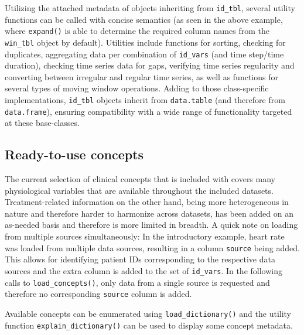 \documentclass[
  notitle,
  nojss,
  noheadings]{jss}
\begin{document}
Utilizing the attached metadata of objects inheriting from
\texttt{id\_tbl}, several utility functions can be called with concise
semantics (as seen in the above example, where \texttt{expand()} is able
to determine the required column names from the \texttt{win\_tbl} object
by default). Utilities include functions for sorting, checking for
duplicates, aggregating data per combination of \texttt{id\_vars} (and
time step/time duration), checking time series data for gaps, verifying
time series regularity and converting between irregular and regular time
series, as well as functions for several types of moving window
operations. Adding to those class-specific implementations,
\texttt{id\_tbl} objects inherit from \texttt{data.table} (and therefore
from \texttt{data.frame}), ensuring compatibility with a wide range of
functionality targeted at these base-classes.

\hypertarget{ready-to-use-concepts}{%
\subsection{Ready-to-use concepts}\label{ready-to-use-concepts}}

The current selection of clinical concepts that is included with
 covers many physiological variables that are available
throughout the included datasets. Treatment-related information on the
other hand, being more heterogeneous in nature and therefore harder to
harmonize across datasets, has been added on an as-needed basis and
therefore is more limited in breadth. A quick note on loading from
multiple sources simultaneously: In the introductory example, heart rate
was loaded from multiple data sources, resulting in a column
\texttt{source} being added. This allows for identifying patient IDs
corresponding to the respective data sources and the extra column is
added to the set of \texttt{id\_vars}. In the following calls to
\texttt{load\_concepts()}, only data from a single source is requested
and therefore no corresponding \texttt{source} column is added.

Available concepts can be enumerated using \texttt{load\_dictionary()}
and the utility function \texttt{explain\_dictionary()} can be used to
display some concept metadata.
\end{document}
